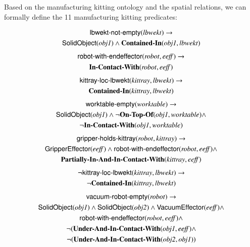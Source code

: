 \documentclass[preprint,12pt]{elsarticle}
\newcommand{\class}[1] {\textsf{#1}}
\newcommand{\stvar}[1] {\textsf{#1}}
\begin{document}
Based on the manufacturing kitting ontology and the spatial relations, we can formally define the 11 manufacturing kitting predicates:

\begin{gather}
\label{eq:lbwekt-not-empty}
\stvar{lbwekt-not-empty}(\mathit{lbwekt}) \rightarrow \\
\class{SolidObject}(\textit{obj1}) \wedge \textbf{Contained-In}(\textit{obj1}, \mathit{lbwekt}) \notag
\end{gather}
\begin{gather}
\label{eq:robot-with-endeffector}
\stvar{robot-with-endeffector}(\mathit{robot},\mathit{eeff}) \rightarrow \\
\textbf{In-Contact-With}(\mathit{robot},\mathit{eeff}) \notag
\end{gather}
\begin{gather}
\label{eq:kittray-loc-lbwekt}
\stvar{kittray-loc-lbwekt}(\mathit{kittray},\mathit{lbwekt}) \rightarrow \\
\textbf{Contained-In}(\mathit{kittray},\mathit{lbwekt}) \notag
\end{gather}
\begin{gather}
\label{eq:worktable-empty}
\stvar{worktable-empty}(\mathit{worktable}) \rightarrow \\
\class{SolidObject}(\textit{obj1}) \wedge \neg\textbf{On-Top-Of}(\textit{obj1}, \mathit{worktable}) \wedge \notag\\
\neg \textbf{In-Contact-With}(\textit{obj1}, \mathit{worktable})\notag
\end{gather}
\begin{gather}
\label{eq:gripper-holds-kittray}
\stvar{gripper-holds-kittray}(\mathit{robot},\mathit{kittray}) \rightarrow \\
\class{GripperEffector}(\mathit{eeff}) \wedge \stvar{robot-with-endeffector}(\mathit{robot},\mathit{eeff}) \wedge \notag\\
\textbf{Partially-In-And-In-Contact-With}(\mathit{kittray}, \mathit{eeff})\notag
\end{gather}
\begin{gather}
\label{eq:neg-kittray-loc-lbwekt}
\neg \stvar{kittray-loc-lbwekt}(\mathit{kittray},\mathit{lbwekt}) \rightarrow\\
\neg \textbf{Contained-In}(\mathit{kittray},\mathit{lbwekt}) \notag
\end{gather}
\begin{gather}
\label{eq:vacuum-robot-empty}
\stvar{vacuum-robot-empty}(\mathit{robot}) \rightarrow \\
\class{SolidObject}(\mathit{obj1}) \wedge \class{SolidObject}(\mathit{obj2}) \wedge \class{VacuumEffector}(\mathit{eeff}) \wedge\notag\\
\stvar{robot-with-endeffector}(\mathit{robot},\mathit{eeff}) \wedge \notag\\ \neg (\textbf{Under-And-In-Contact-With}(\mathit{obj1},\mathit{eeff}) \wedge \notag\\
\neg (\textbf{Under-And-In-Contact-With}(\mathit{obj2},\mathit{obj1}))\notag
\end{gather}
\end{document}
